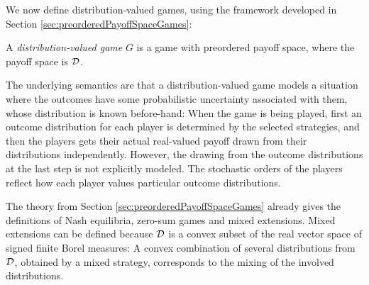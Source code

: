 \documentclass[a4paper]{scrreprt}
\begin{document}
    We now define distribution-valued games, using the framework developed in Section \ref{sec:preorderedPayoffSpaceGames}:
    \begin{defn}
        A \emph{distribution-valued game} $G$ is a game with preordered payoff space, where the payoff space is $\mathcal{D}$.
        \label{def:distributionValuedGame}
    \end{defn}
    The underlying semantics are that a distribution-valued game models a situation where the outcomes have some probabilistic uncertainty associated with them, whose distribution is known before-hand: When the game is being played, first an outcome distribution for each player is determined by the selected strategies, and then the players gets their actual real-valued payoff drawn from their distributions independently.
    However, the drawing from the outcome distributions at the last step is not explicitly modeled. The stochastic orders of the players reflect how each player values particular outcome distributions.

    The theory from Section \ref{sec:preorderedPayoffSpaceGames} already gives the definitions of Nash equilibria, zero-sum games and mixed extensions. 
    Mixed extensions can be defined because $\mathcal{D}$ is a convex subset of the real vector space of signed finite Borel measures: A convex combination of several distributions from $\mathcal{D}$, obtained by a mixed strategy, corresponds to the mixing of the involved distributions.
    
\end{document}
